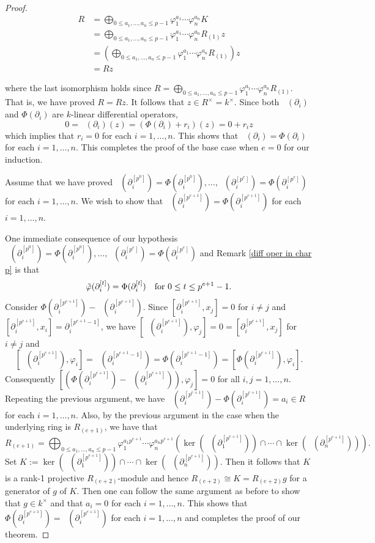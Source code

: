 \documentclass[11pt]{amsart}
\theoremstyle{definition}
\theoremstyle{remark}
\numberwithin{equation}{subsection}
\DeclareMathOperator{\tv}{\tilde{\varphi}}
\begin{document}
\begin{proof}
\begin{align*}
R&= \bigoplus_{0\leq a_1,\dots,a_n\leq p-1}\varphi_1^{a_1}\cdots \varphi^{a_n}_nK\\
&=\bigoplus_{0\leq a_1,\dots,a_n\leq p-1}\varphi_1^{a_1}\cdots \varphi^{a_n}_nR_{(1)}z\\
&=(\bigoplus_{0\leq a_1,\dots,a_n\leq p-1}\varphi_1^{a_1}\cdots \varphi^{a_n}_nR_{(1)})z\\
&= Rz
\end{align*}

where the last isomorphism holds since $R= \bigoplus_{0\leq a_1,\dots,a_n\leq p-1}\varphi_1^{a_1}\cdots \varphi^{a_n}_nR_{(1)}$. That is, we have proved $R=Rz$. It follows that $z\in R^\times=k^\times$. Since both $\tv(\partial_i)$ and $\Phi(\partial_i)$ are $k$-linear differential operators,
\[0=\tv(\partial_i)(z)=(\Phi(\partial_i)+r_i)(z)=0+r_iz\]
which implies that $r_i=0$ for each $i=1,\dots,n$. This shows that $\tv(\partial_i)=\Phi(\partial_i)$ for each $i=1,\dots,n$. This completes the proof of the base case when $e=0$ for our induction.

Assume that we have proved $\tv(\partial^{[p^0]}_i)=\Phi(\partial^{[p^0]}_i),\dots, \tv(\partial^{[p^e]}_i)=\Phi(\partial^{[p^e]}_i)$ for each $i=1,\dots,n$. We wish to show that $ \tv(\partial^{[p^{e+1}]}_i)=\Phi(\partial^{[p^{e+1}]}_i)$ for each $i=1,\dots,n$.

One immediate consequence of our hypothesis $\tv(\partial^{[p^0]}_i)=\Phi(\partial^{[p^0]}_i),\dots, \tv(\partial^{[p^e]}_i)=\Phi(\partial^{[p^e]}_i)$ and Remark \ref{diff oper in char p} is that
\[\tv(\partial^{[t]}_i)=\Phi(\partial^{[t]}_i)\quad {\rm for}\ 0\leq t\leq p^{e+1}-1.\]
Consider $\Phi(\partial^{[p^{e+1}]}_i)-\tv(\partial^{[p^{e+1}]}_i)$. Since $[\partial^{[p^{e+1}]}_i, x_j]=0$ for $i\neq j$ and $[\partial^{[p^{e+1}]}_i, x_i]=\partial^{[p^{e+1}-1]}_i$, we have $[\tv(\partial^{[p^{e+1}]}_i), \varphi_j]=0=[\partial^{[p^{e+1}]}_i, x_j]$ for $i\neq j$ and 
\[[\tv(\partial^{[p^{e+1}]}_i), \varphi_i]=\tv(\partial^{[p^{e+1}-1]}_i)=\Phi(\partial^{[p^{e+1}-1]}_i)=[\Phi(\partial^{[p^{e+1}]}_i), \varphi_i].\]
Consequently $[(\Phi(\partial^{[p^{e+1}]}_i)-\tv(\partial^{[p^{e+1}]}_i)), \varphi_j]=0$ for all $i,j=1,\dots,n$. Repeating the previous argument, we have $\tv(\partial^{[p^{e+1}]}_i)-\Phi(\partial^{[p^{e+1}]}_i)=a_i\in R$ for each $i=1,\dots,n$. Also, by the previous argument in the case when the underlying ring is $R_{(e+1)}$, we have that 
\[R_{(e+1)}= \bigoplus_{0\leq a_1,\dots,a_n\leq p-1}\varphi_1^{a_1p^{e+1}}\cdots \varphi^{a_np^{e+1}}_n\left(\ker(\tv(\partial^{[p^{e+1}]}_1))\cap\cdots \cap \ker(\tv(\partial^{[p^{e+1}]}_n))\right).\]
Set $K:=\ker(\tv(\partial^{[p^{e+1}]}_1))\cap\cdots \cap \ker(\tv(\partial^{[p^{e+1}]}_n))$. Then it follows that $K$ is a rank-1 projective $R_{(e+2)}$-module and hence $R_{(e+2)}\cong K=R_{(e+2)}g$ for a generator of $g$ of $K$. Then one can follow the same argument as before to show that $g\in k^\times$ and that $a_i=0$ for each $i=1,\dots,n$. This shows that $\Phi(\partial^{[p^{e+1}]}_i)=\tv(\partial^{[p^{e+1}]}_i)$ for each $i=1,\dots,n$ and completes the proof of our theorem.
\end{proof}
\end{document}
